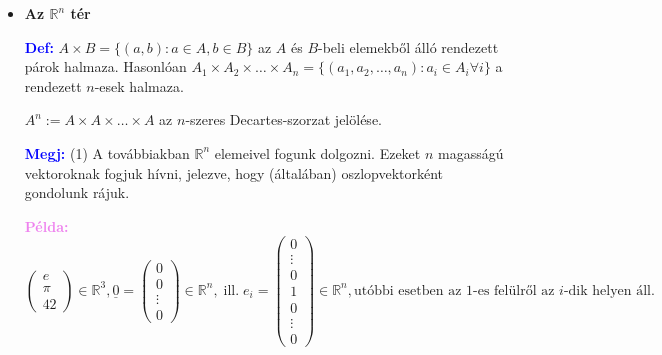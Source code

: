 \documentclass[../../szobeli.tex]{subfiles}
\begin{document}
\begin{center}
    \noindent{}
\end{center}

    \begin{itemize}
        \item \textbf{Az $\mathbb{R}^n$ tér} 
        
            \textcolor{blue}{\textbf{Def:}} $A \times B = \{(a,b):a\in A,b\in B\}$ az $A$ és $B$-beli elemekből álló rendezett párok halmaza. Hasonlóan $A_1 \times A_2 \times \dots \times A_n = \{(a_1, a_2,\dots,a_n):a_i \in A_i \forall i\}$ a rendezett $n$-esek halmaza.

            $A^n:= A \times A \times \dots \times A$ az $n$-szeres Decartes-szorzat jelölése. 

            \textcolor{blue}{\textbf{Megj:}} (1) A továbbiakban $\mathbb{R}^n$ elemeivel fogunk dolgozni. Ezeket $n$ magasságú vektoroknak fogjuk hívni, jelezve, hogy (általában) oszlopvektorként gondolunk rájuk. 

            \textcolor{violet}{\textbf{Példa:}} 
            \[
            \begin{pmatrix}
                e \\
                \pi \\
                42 
            \end{pmatrix}  
            \in \mathbb{R}^3, \underline{0} = 
            \begin{pmatrix}
                0 \\
                0 \\
                \vdots \\
                0 
            \end{pmatrix}  
            \in \mathbb{R}^n,\; \textrm{ill.}\; e_i = 
            \begin{pmatrix}
                0 \\
                \vdots \\
                0 \\
                1 \\
                0 \\
                \vdots \\
                0 
            \end{pmatrix} 
            \in \mathbb{R}^n, \textrm{utóbbi esetben az 1-es felülről az }i \textrm{-dik helyen áll.}
            \]


\end{itemize}
\end{document}

